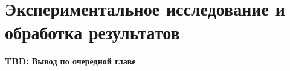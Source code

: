 \chapter{Экспериментальное исследование и обработка результатов}\label{chapter41}





\chapterconclusion

\textbf{TBD: Вывод по очередной главе}